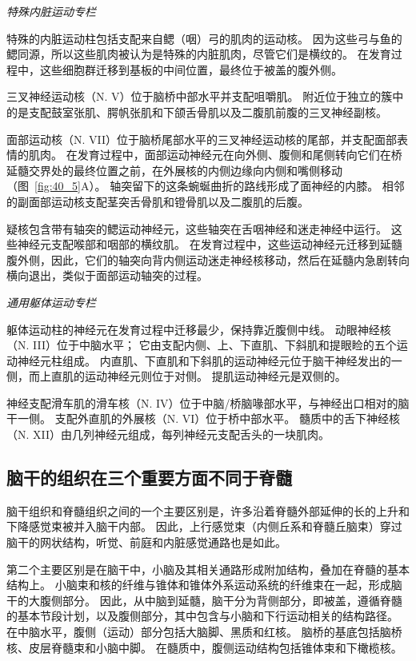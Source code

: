 \textit{特殊内脏运动专栏}

特殊的内脏运动柱包括支配来自鳃（咽）弓的肌肉的运动核。
因为这些弓与鱼的鳃同源，所以这些肌肉被认为是特殊的内脏肌肉，尽管它们是横纹的。
在发育过程中，这些细胞群迁移到基板的中间位置，最终位于被盖的腹外侧。


三叉神经运动核（N. V）位于脑桥中部水平并支配咀嚼肌。
附近位于独立的簇中的是支配鼓室张肌、腭帆张肌和下颌舌骨肌以及二腹肌前腹的三叉神经副核。


面部运动核（N. VII）位于脑桥尾部水平的三叉神经运动核的尾部，并支配面部表情的肌肉。
在发育过程中，面部运动神经元在向外侧、腹侧和尾侧转向它们在桥延髓交界处的最终位置之前，在外展核的内侧边缘向内侧和嘴侧移动（图~\ref{fig:40_5}A）。
轴突留下的这条蜿蜒曲折的路线形成了面神经的内膝。
相邻的副面部运动核支配茎突舌骨肌和镫骨肌以及二腹肌的后腹。


疑核包含带有轴突的鳃运动神经元，这些轴突在舌咽神经和迷走神经中运行。
这些神经元支配喉部和咽部的横纹肌。
在发育过程中，这些运动神经元迁移到延髓腹外侧，因此，它们的轴突向背内侧运动迷走神经核移动，然后在延髓内急剧转向横向退出，类似于面部运动轴突的过程。


\textit{通用躯体运动专栏}

躯体运动柱的神经元在发育过程中迁移最少，保持靠近腹侧中线。
动眼神经核（N. III）位于中脑水平；
它由支配内侧、上、下直肌、下斜肌和提眼睑的五个运动神经元柱组成。
内直肌、下直肌和下斜肌的运动神经元位于脑干神经发出的一侧，而上直肌的运动神经元则位于对侧。
提肌运动神经元是双侧的。


神经支配滑车肌的滑车核（N. IV）位于中脑/桥脑喙部水平，与神经出口相对的脑干一侧。
支配外直肌的外展核（N. VI）位于桥中部水平。
髓质中的舌下神经核（N. XII）由几列神经元组成，每列神经元支配舌头的一块肌肉。



\subsection{脑干的组织在三个重要方面不同于脊髓}

脑干组织和脊髓组织之间的一个主要区别是，许多沿着脊髓外部延伸的长的上升和下降感觉束被并入脑干内部。
因此，上行感觉束（内侧丘系和脊髓丘脑束）穿过脑干的网状结构，听觉、前庭和内脏感觉通路也是如此。


第二个主要区别是在脑干中，小脑及其相关通路形成附加结构，叠加在脊髓的基本结构上。
小脑束和核的纤维与锥体和锥体外系运动系统的纤维束在一起，形成脑干的大腹侧部分。
因此，从中脑到延髓，脑干分为背侧部分，即被盖，遵循脊髓的基本节段计划，以及腹侧部分，其中包含与小脑和下行运动相关的结构路径。
在中脑水平，腹侧（运动）部分包括大脑脚、黑质和红核。
脑桥的基底包括脑桥核、皮层脊髓束和小脑中脚。
在髓质中，腹侧运动结构包括锥体束和下橄榄核。


